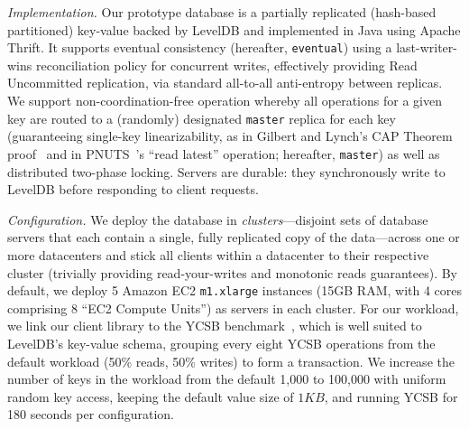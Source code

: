 \vspace{.5em}\noindent\textit{Implementation.} Our prototype database
is a partially replicated (hash-based partitioned) key-value backed by
LevelDB and implemented in Java using Apache Thrift. It supports
eventual consistency (hereafter, \texttt{eventual}) using a
last-writer-wins reconciliation policy for concurrent writes,
effectively providing Read Uncommitted replication, via standard
all-to-all anti-entropy between replicas. We support
non-coordination-free operation whereby all operations for a given key
are routed to a (randomly) designated \texttt{master} replica for each
key (guaranteeing single-key linearizability, as in Gilbert and
Lynch's CAP Theorem proof~\cite{gilbert-cap} and in
PNUTS~\cite{pnuts}'s ``read latest'' operation; hereafter,
\texttt{master}) as well as distributed two-phase locking. Servers are
durable: they synchronously write to LevelDB before responding to
client requests.

\vspace{.5em}\noindent\textit{Configuration.} We deploy the database
in \textit{clusters}---disjoint sets of database servers that each
contain a single, fully replicated copy of the data---across one or
more datacenters and stick all clients within a datacenter to their
respective cluster (trivially providing read-your-writes and monotonic
reads guarantees). By default, we deploy 5 Amazon EC2
\texttt{m1.xlarge} instances (15GB RAM, with 4 cores comprising 8
``EC2 Compute Units'') as servers in each cluster. For our workload,
we link our client library to the YCSB benchmark~\cite{ycsb}, which is
well suited to LevelDB's key-value schema, grouping every eight YCSB
operations from the default workload (50\% reads, 50\% writes) to form
a transaction. We increase the number of keys in the workload from the
default 1,000 to 100,000 with uniform random key access, keeping the
default value size of $1KB$, and running YCSB for 180 seconds per
configuration.

